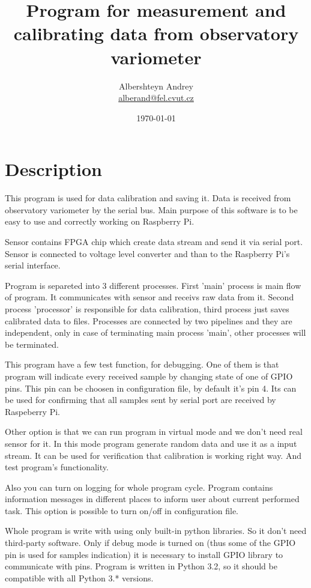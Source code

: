 \documentclass[12pt]{article}
\title{Program for measurement and calibrating data from observatory
    variometer}
\author{Albershteyn Andrey \\ 
    \href{mailto:alberand@fel.cvut.cz}{alberand@fel.cvut.cz}}
\date{\today}
\begin{document}
\maketitle

\renewcommand*\contentsname{Contents}
\tableofcontents
\section{Description}
\par This program is used for data calibration and saving it. Data is received
from observatory variometer by the serial bus. Main purpose of this software is 
to be easy to use and correctly working on Raspberry Pi.
\par Sensor contains FPGA chip which create data stream and send it via serial
port. Sensor is connected to voltage level converter and than to the Raspberry
Pi's serial interface.
\par Program is separeted into 3 different processes. First 'main' process is 
main flow of program. It communicates with sensor and receivs raw data from it.
Second process 'processor' is responsible for data calibration, third process
just saves calibrated data to files. Processes are connected by two pipelines 
and they are independent, only in case of terminating main process 'main', other
processes will be terminated.
\newline
\par This program have a few test function, for debugging. One of them is that
program will indicate every received sample by changing state of one of GPIO
pins. This pin can be choosen in configuration file, by default it's pin 4. Its
can be used for confirming that all samples sent by serial port are received by
Raspeberry Pi.
\par Other option is that we can run program in virtual mode and we don't need
real sensor for it. In this mode program generate random data and use it as a
input stream. It can be used for verification that calibration is working right
way. And test program's functionality.
\par Also you can turn on logging for whole program cycle. Program contains
information messages in different places to inform user about current performed
task. This option is possible to turn on/off in configuration file.
\newline
\par Whole program is write with using only built-in python libraries. So it
don't need third-party software. Only if debug mode is turned on (thus some of
the GPIO pin is used for samples indication) it is necessary to install GPIO
library to communicate with pins. Program is written in Python 3.2, so it should
be compatible with all Python 3.* versions.
\end{document}
